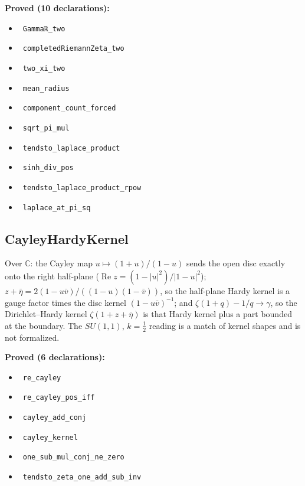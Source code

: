 \documentclass{report}
\theoremstyle{definition}
\begin{document}
\noindent\textbf{Proved (10 declarations):}
\begin{itemize}
  \item {}\leanok\ \texttt{Gammaℝ\_two}
  \item {}\leanok\ \texttt{completedRiemannZeta\_two}
  \item {}\leanok\ \texttt{two\_xi\_two}
  \item {}\leanok\ \texttt{mean\_radius}
  \item {}\leanok\ \texttt{component\_count\_forced}
  \item {}\leanok\ \texttt{sqrt\_pi\_mul}
  \item {}\leanok\ \texttt{tendsto\_laplace\_product}
  \item {}\leanok\ \texttt{sinh\_div\_pos}
  \item {}\leanok\ \texttt{tendsto\_laplace\_product\_rpow}
  \item {}\leanok\ \texttt{laplace\_at\_pi\_sq}
\end{itemize}

\subsection{CayleyHardyKernel}
Over $\mathbb{C}$: the Cayley map $u\mapsto(1+u)/(1-u)$ sends the open disc exactly onto the right half-plane ($\operatorname{Re}z=(1-|u|^2)/|1-u|^2$); $z+\bar\eta=2(1-u\bar v)/((1-u)(1-\bar v))$, so the half-plane Hardy kernel is a gauge factor times the disc kernel $(1-u\bar v)^{-1}$; and $\zeta(1+q)-1/q\to\gamma$, so the Dirichlet--Hardy kernel $\zeta(1+z+\bar\eta)$ is that Hardy kernel plus a part bounded at the boundary. The $SU(1,1)$, $k=\tfrac12$ reading is a match of kernel shapes and is not formalized.

\noindent\textbf{Proved (6 declarations):}
\begin{itemize}
  \item {}\leanok\ \texttt{re\_cayley}
  \item {}\leanok\ \texttt{re\_cayley\_pos\_iff}
  \item {}\leanok\ \texttt{cayley\_add\_conj}
  \item {}\leanok\ \texttt{cayley\_kernel}
  \item {}\leanok\ \texttt{one\_sub\_mul\_conj\_ne\_zero}
  \item {}\leanok\ \texttt{tendsto\_zeta\_one\_add\_sub\_inv}
\end{itemize}
\end{document}
